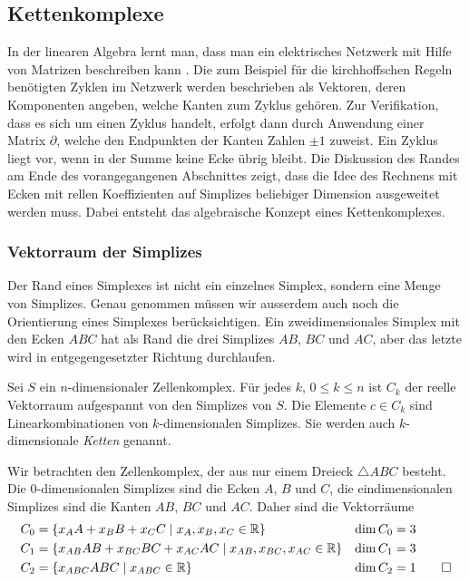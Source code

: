 %
%
\subsection{Kettenkomplexe
\label{buch:topologie:subsection:kettenkomplexe}}
In der linearen Algebra lernt man, dass man ein elektrisches
Netzwerk mit Hilfe von Matrizen beschreiben kann
\cite[Abschnitt~2.A]{buch:linalg}.
Die zum Beispiel für die kirchhoffschen Regeln benötigten Zyklen
im Netzwerk werden beschrieben als Vektoren, deren Komponenten angeben,
welche Kanten zum Zyklus gehören.
Zur Verifikation, dass es sich um einen Zyklus handelt, erfolgt dann
durch Anwendung einer Matrix $\partial$, welche den Endpunkten der
Kanten Zahlen $\pm 1$ zuweist.
Ein Zyklus liegt vor, wenn in der Summe keine Ecke übrig bleibt.
Die Diskussion des Randes am Ende des vorangegangenen Abschnittes
zeigt, dass die Idee des Rechnens mit Ecken mit rellen Koeffizienten 
auf Simplizes beliebiger Dimension ausgeweitet werden muss.
Dabei entsteht das algebraische Konzept eines Kettenkomplexes.

%
%
\subsubsection{Vektorraum der Simplizes}
Der Rand eines Simplexes ist nicht ein einzelnes Simplex, sondern
eine Menge von Simplizes.
Genau genommen müssen wir ausserdem auch noch die Orientierung eines
Simplexes berücksichtigen.
Ein zweidimensionales Simplex mit den Ecken $ABC$ hat als Rand
die drei Simplizes $AB$, $BC$ und $AC$, aber das letzte wird in
entgegengesetzter Richtung durchlaufen.

\begin{definition}
Sei $S$ ein $n$-dimensionaler Zellenkomplex.
Für jedes $k$, $0\le k\le n$ ist $C_k$ der reelle Vektorraum aufgespannt
von den Simplizes von $S$.
Die Elemente $c\in C_k$ sind Linearkombinationen von $k$-dimensionalen
Simplizes.
Sie werden auch $k$-dimensionale \emph{Ketten} genannt.
%
\end{definition}

\begin{beispiel}
\label{buch:topologie:eulercharakteristik:bsp:dreieck}
Wir betrachten den Zellenkomplex, der aus nur einem Dreieck
$\triangle ABC$ besteht.
Die $0$-dimensionalen Simplizes sind die Ecken $A$, $B$ und $C$, 
die eindimensionalen Simplizes sind die Kanten $AB$, $BC$ und $AC$.
Daher sind die Vektorräume
\begin{align*}
C_0 &= \{ x_A A + x_B B + x_C C\mid x_A, x_B, x_C\in\mathbb{R}\}
&
\dim C_0 &= 3
\\
C_1 &= \{ x_{AB} AB + x_{BC} BC + x_{AC} AC\mid x_{AB}, x_{BC}, x_{AC} \in\mathbb{R}\}
&
\dim C_1 &= 3
\\
C_2 &= \{ x_{ABC} ABC\mid x_{ABC}\in\mathbb{R}\}
&
\dim C_2 &= 1
\qedhere
\end{align*}
\end{beispiel}


